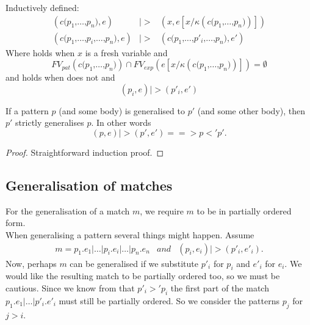 \begin{definition}
\label{def:gener-patt}
Inductively defined:
\begin{eqnarray}
  (c \texttt{(} p_1 \texttt{,} \ldots \texttt{,} p_n \texttt{)} , e) &|>& (x , e[x
  / \kappa (c \texttt{(} p_1 \texttt{,} \ldots \texttt{,} p_n \texttt{)} )]) \label{eq:single-gen-1}\\
  (c \texttt{(} p_1 \texttt{,} \ldots \texttt{,} p_i \texttt{,} \ldots
  \texttt{,} p_n \texttt{)}, e) &|>&
  (c \texttt{(} p_1 \texttt{,} \ldots \texttt{,} p'_i \texttt{,} \ldots
  \texttt{,} p_n \texttt{)}, e') \label{eq:single-gen-2}
\end{eqnarray}
Where  holds when $x$ is a fresh variable and
\[
FV_{pat}(c\texttt{(}p_1\texttt{,}\ldots\texttt{,}p_n\texttt{)}) \cap FV_{exp}(e[x/\kappa
(c\texttt{(}p_1\texttt{,}\ldots\texttt{,}p_n\texttt{)})]) = \emptyset
\]
and  holds when  does not and
\[
(p_i , e) |> (p'_i , e')
\]
\end{definition}

\begin{lemma}\label{lem:single-gen-imp-gen}
  If a pattern $p$ (and some body) is generalised to $p'$ (and some other
  body), then $p'$ strictly generalises $p$. In other words
  \[
  (p, e) |> (p', e') ==> p <' p'.
  \]
\end{lemma}
\begin{proof}
  Straightforward induction proof.
\end{proof}

\subsection{Generalisation of matches}
For the generalisation of a match $m$, we require $m$ to be in partially ordered
form.
\\[1em]
When generalising a pattern several things might happen. Assume
\begin{eqnarray*}[rqTcql]
  m = p_1 \texttt{.} e_1 \texttt{|} \ldots \texttt{|} p_i \texttt{.} e_i
  \texttt{|} \ldots \texttt{|} p_n \texttt{.} e_n & and & (p_i, e_i) |> (p'_i,
  e'_i).
\end{eqnarray*}
Now, perhaps $m$ can be generalised if we substitute $p'_i$ for $p_i$ and $e'_i$
for $e_i$. We would like the resulting match to be partially ordered too, so we
must be cautious. Since we know from  that $p'_i >'
p_i$ the first part of the match $p_1 \texttt{.} e_1 \texttt{|} \ldots
\texttt{|} p'_i \texttt{.} e'_i$ must still be partially ordered. So we consider
the patterns $p_j$ for $j > i$.

